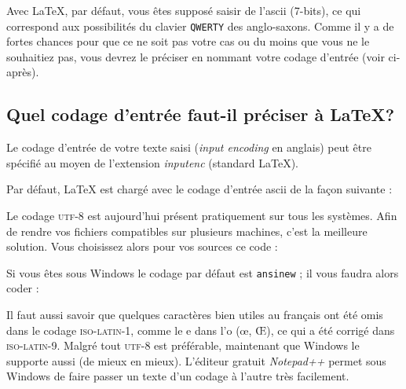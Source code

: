 \documentclass[a4paper,12pt,openright]{article}
\begin{document}
\indpos Avec \LaTeX, par défaut, vous êtes supposé saisir de l'{\sc ascii} (7-bits), ce qui
correspond aux possibilités du clavier \texttt{QWERTY} des anglo-saxons. Comme il y a
de fortes chances pour que ce ne soit pas votre cas ou du moins que vous ne
le souhaitiez pas, vous devrez le préciser en nommant votre codage d'entrée
(voir ci-après).
\subsection{Quel codage d'entrée faut-il préciser à \LaTeX?}
\label{inenco}
 Le codage d'entrée de votre texte saisi ({\it input encoding} en anglais)
peut être spécifié au moyen de l'extension  \textit{inputenc}
(standard \LaTeX).

 Par défaut, \LaTeX{} est chargé avec le codage d'entrée {\sc ascii} de la façon
suivante :\indpos
\begin{center}
\end{center}
\begin{MAJ}

Le codage \textsc{utf-8} est aujourd'hui présent pratiquement sur tous les systèmes.
Afin de rendre vos fichiers compatibles sur plusieurs machines,
c'est la meilleure solution.
Vous choisissez alors pour vos sources \pgLapdTeX ce code :
\begin{center}
\end{center}
\end{MAJ}

Si vous êtes sous Windows le codage par défaut est \texttt{ansinew} ; il vous
faudra alors coder :
\begin{center}
\end{center}
\begin{MAJ}
Il faut aussi savoir que quelques caractères bien utiles au français
ont été omis dans le codage \textsc{iso-latin-1}, comme le e dans l'o (œ, Œ),
ce qui a été corrigé dans \textsc{iso-latin-9}. 
Malgré tout \textsc{utf-8} est préférable, maintenant que Windows
le supporte aussi (de mieux en mieux). L'éditeur gratuit \textit{Notepad++} 
permet sous Windows de faire passer un texte d'un codage à l'autre très facilement.
\end{MAJ}
\end{document}
